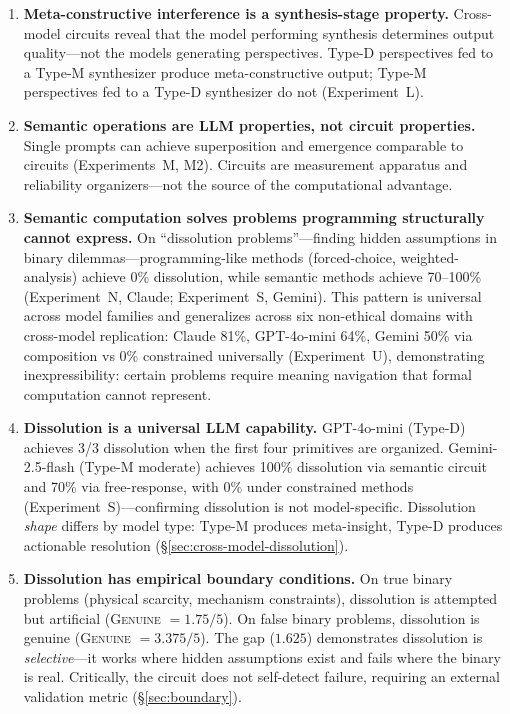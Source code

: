 \documentclass[11pt,a4paper]{article}
\begin{document}
\begin{enumerate}[leftmargin=*]
\item \textbf{Meta-constructive interference is a synthesis-stage property.} Cross-model circuits reveal that the model performing synthesis determines output quality---not the models generating perspectives. Type-D perspectives fed to a Type-M synthesizer produce meta-constructive output; Type-M perspectives fed to a Type-D synthesizer do not (Experiment~L).

\item \textbf{Semantic operations are LLM properties, not circuit properties.} Single prompts can achieve superposition and emergence comparable to circuits (Experiments~M, M2). Circuits are measurement apparatus and reliability organizers---not the source of the computational advantage.

\item \textbf{Semantic computation solves problems programming structurally cannot express.} On ``dissolution problems''---finding hidden assumptions in binary dilemmas---programming-like methods (forced-choice, weighted-analysis) achieve 0\% dissolution, while semantic methods achieve 70--100\% (Experiment~N, Claude; Experiment~S, Gemini). This pattern is universal across model families and generalizes across six non-ethical domains with cross-model replication: Claude 81\%, GPT-4o-mini 64\%, Gemini 50\% via composition vs 0\% constrained universally (Experiment~U), demonstrating inexpressibility: certain problems require meaning navigation that formal computation cannot represent.

\item \textbf{Dissolution is a universal LLM capability.} GPT-4o-mini (Type-D) achieves 3/3 dissolution when the first four primitives are organized. Gemini-2.5-flash (Type-M moderate) achieves 100\% dissolution via semantic circuit and 70\% via free-response, with 0\% under constrained methods (Experiment~S)---confirming dissolution is not model-specific. Dissolution \emph{shape} differs by model type: Type-M produces meta-insight, Type-D produces actionable resolution (\S\ref{sec:cross-model-dissolution}).

\item \textbf{Dissolution has empirical boundary conditions.} On true binary problems (physical scarcity, mechanism constraints), dissolution is attempted but artificial (\textsc{Genuine} $= 1.75/5$). On false binary problems, dissolution is genuine (\textsc{Genuine} $= 3.375/5$). The gap ($1.625$) demonstrates dissolution is \emph{selective}---it works where hidden assumptions exist and fails where the binary is real. Critically, the circuit does not self-detect failure, requiring an external validation metric (\S\ref{sec:boundary}).


\end{enumerate}
\end{document}
